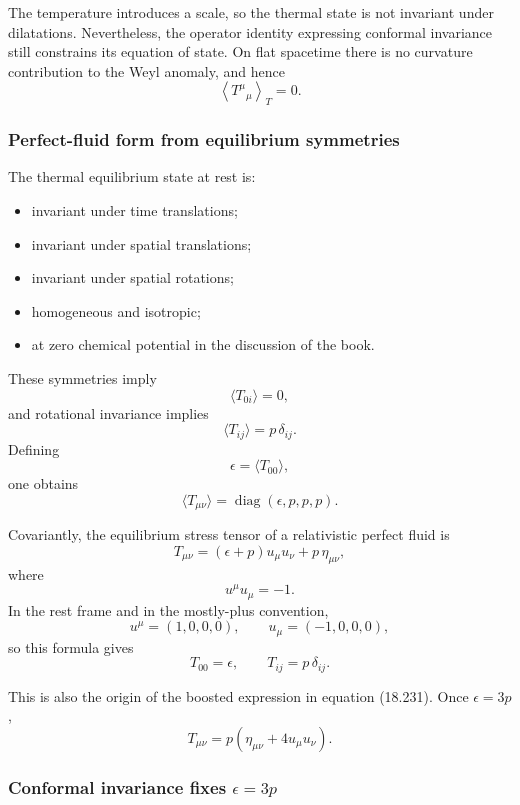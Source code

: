 \documentclass[
  10pt,
  a4paper,
  openany]{book}
\providecommand{\tightlist}{%
  \setlength{\itemsep}{0pt}\setlength{\parskip}{0pt}}
\begin{document}
The temperature introduces a scale, so the thermal state is not
invariant under dilatations. Nevertheless, the operator identity
expressing conformal invariance still constrains its equation of state.
On flat spacetime there is no curvature contribution to the Weyl
anomaly, and hence \[
\left\langle T^\mu{}_\mu\right\rangle_T=0.
\]

\subsubsection{Perfect-fluid form from equilibrium
symmetries}\label{perfect-fluid-form-from-equilibrium-symmetries}

The thermal equilibrium state at rest is:

\begin{itemize}
\tightlist
\item
  invariant under time translations;
\item
  invariant under spatial translations;
\item
  invariant under spatial rotations;
\item
  homogeneous and isotropic;
\item
  at zero chemical potential in the discussion of the book.
\end{itemize}

These symmetries imply \[
\langle T_{0i}\rangle=0,
\] and rotational invariance implies \[
\langle T_{ij}\rangle=p\,\delta_{ij}.
\] Defining \[
\epsilon=\langle T_{00}\rangle,
\] one obtains \[
\boxed{
\langle T_{\mu\nu}\rangle
=
\operatorname{diag}(\epsilon,p,p,p)
}.
\]

Covariantly, the equilibrium stress tensor of a relativistic perfect
fluid is \[
\boxed{
T_{\mu\nu}
=(\epsilon+p)u_\mu u_\nu
+p\,\eta_{\mu\nu}
},
\] where \[
u^\mu u_\mu=-1.
\] In the rest frame and in the mostly-plus convention, \[
u^\mu=(1,0,0,0),
\qquad
u_\mu=(-1,0,0,0),
\] so this formula gives \[
T_{00}=\epsilon,
\qquad
T_{ij}=p\,\delta_{ij}.
\]

This is also the origin of the boosted expression in equation (18.231).
Once \(\epsilon=3p\), \[
T_{\mu\nu}
=p\left(
\eta_{\mu\nu}+4u_\mu u_\nu
\right).
\]

\subsubsection{\texorpdfstring{Conformal invariance fixes
\(\epsilon=3p\)}{Conformal invariance fixes \textbackslash epsilon=3p}}\label{conformal-invariance-fixes-epsilon3p}
\end{document}
